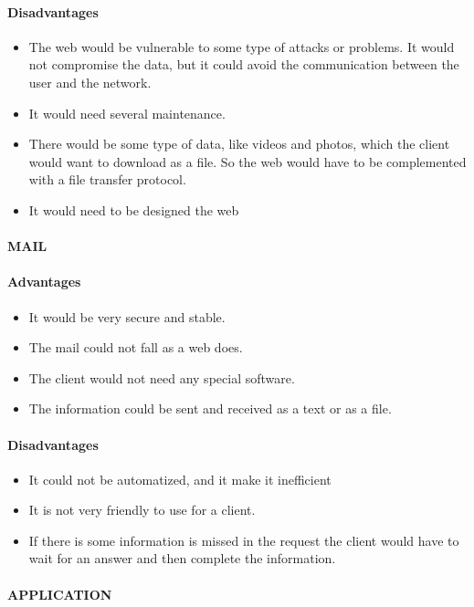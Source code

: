 \paragraph{Disadvantages}
\begin{itemize}
\item The web would be vulnerable to some type of attacks or problems. It would not compromise the data, but it could avoid the communication between the user and the network.
\item It would need several maintenance.
\item There would be some type of data, like videos and photos, which the client would want to download as a file. So the web would have to be complemented with a file transfer protocol.
\item It would need to be designed the web
\end{itemize}

\paragraph{MAIL}
\paragraph{Advantages}
\begin{itemize}
\item It would be very secure and stable.
\item The mail could not fall as a web does.
\item The client would not need any special software.
\item The information could be sent and received as a text or as a file.
\end{itemize}
\paragraph{Disadvantages}
\begin{itemize}
\item It could not be automatized, and it make it inefficient
\item It is not very friendly to use for a client.
\item If there is some information is missed in the request the client would have to wait for an answer and then complete the information. 
\end{itemize}

\paragraph{APPLICATION}
